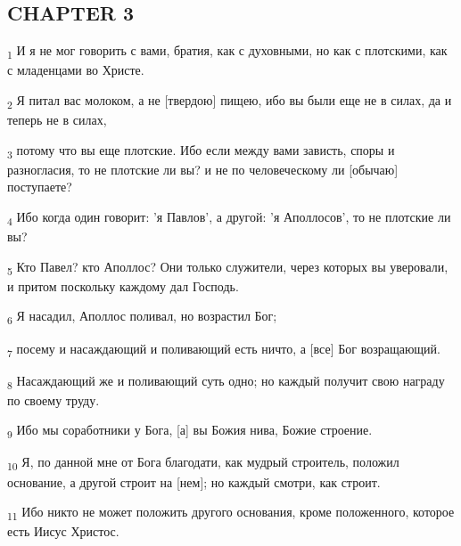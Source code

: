 \subsection{CHAPTER 3}
\begin{tcolorbox}
\textsubscript{1} И я не мог говорить с вами, братия, как с духовными, но как с плотскими, как с младенцами во Христе.
\end{tcolorbox}
\begin{tcolorbox}
\textsubscript{2} Я питал вас молоком, а не [твердою] пищею, ибо вы были еще не в силах, да и теперь не в силах,
\end{tcolorbox}
\begin{tcolorbox}
\textsubscript{3} потому что вы еще плотские. Ибо если между вами зависть, споры и разногласия, то не плотские ли вы? и не по человеческому ли [обычаю] поступаете?
\end{tcolorbox}
\begin{tcolorbox}
\textsubscript{4} Ибо когда один говорит: 'я Павлов', а другой: 'я Аполлосов', то не плотские ли вы?
\end{tcolorbox}
\begin{tcolorbox}
\textsubscript{5} Кто Павел? кто Аполлос? Они только служители, через которых вы уверовали, и притом поскольку каждому дал Господь.
\end{tcolorbox}
\begin{tcolorbox}
\textsubscript{6} Я насадил, Аполлос поливал, но возрастил Бог;
\end{tcolorbox}
\begin{tcolorbox}
\textsubscript{7} посему и насаждающий и поливающий есть ничто, а [все] Бог возращающий.
\end{tcolorbox}
\begin{tcolorbox}
\textsubscript{8} Насаждающий же и поливающий суть одно; но каждый получит свою награду по своему труду.
\end{tcolorbox}
\begin{tcolorbox}
\textsubscript{9} Ибо мы соработники у Бога, [а] вы Божия нива, Божие строение.
\end{tcolorbox}
\begin{tcolorbox}
\textsubscript{10} Я, по данной мне от Бога благодати, как мудрый строитель, положил основание, а другой строит на [нем]; но каждый смотри, как строит.
\end{tcolorbox}
\begin{tcolorbox}
\textsubscript{11} Ибо никто не может положить другого основания, кроме положенного, которое есть Иисус Христос.
\end{tcolorbox}

